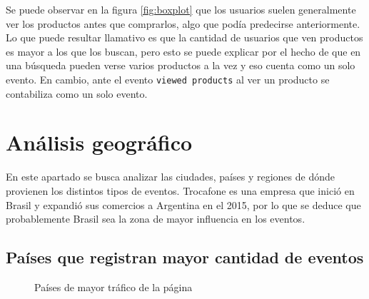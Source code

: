 \documentclass[a4paper]{article}
\begin{document}
Se puede observar en la figura \ref{fig:boxplot} que los usuarios suelen generalmente ver los productos antes que comprarlos, algo que podía predecirse anteriormente. Lo que puede resultar llamativo es que la cantidad de usuarios que ven productos es mayor a los que los buscan, pero esto se puede explicar por el hecho de que en una búsqueda pueden verse varios productos a la vez y eso cuenta como un solo evento. En cambio, ante el evento \texttt{viewed products} al ver un producto se contabiliza como un solo evento.

\section{Análisis geográfico}

En este apartado se busca analizar las ciudades, países y regiones de dónde provienen los distintos tipos de eventos. Trocafone es una empresa que inició en Brasil y expandió sus comercios a Argentina en el 2015, por lo que se deduce que probablemente Brasil sea la zona de mayor influencia en los eventos.

\subsection{Países que registran mayor cantidad de eventos} 

\begin{figure}[h!]
	\caption{Países de mayor tráfico de la página}
	\label{fig:brazilrules}
\end{figure}
\end{document}

